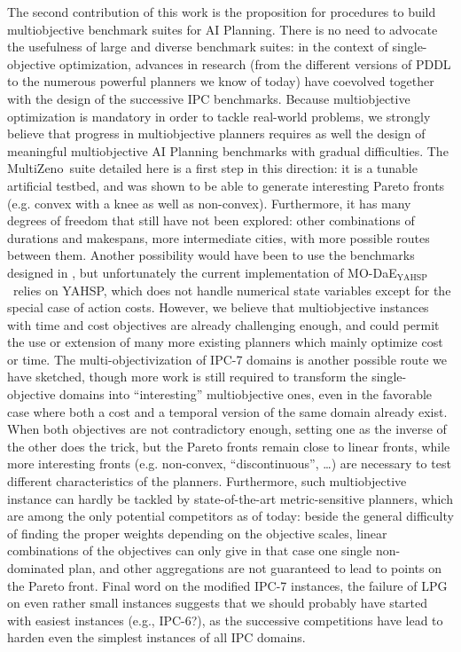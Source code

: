 \documentclass{article}
\newcommand{\MODAEYAHSP}{{\sc MO-DaE$_{\text{YAHSP}}$}}
\def\MULTIZENO{{\sc MultiZeno}}
\begin{document}
The second contribution of this work is the proposition for procedures to build multiobjective benchmark suites for AI Planning. There is no need to advocate the usefulness of large and diverse benchmark suites: in the context of single-objective optimization, advances in research (from the different versions of PDDL to the numerous powerful planners we know of today) have coevolved together with the design of the successive IPC benchmarks. Because multiobjective optimization is mandatory in order to tackle real-world problems, we strongly believe that progress in multiobjective planners requires as well the design of meaningful multiobjective AI Planning benchmarks with gradual difficulties. The \MULTIZENO\ suite detailed here is a first step in this direction: it is a tunable artificial testbed, and was shown to be able to generate interesting Pareto fronts (e.g. convex with a knee as well as non-convex). Furthermore, it has many degrees of freedom that still have not been explored: other combinations of 
durations and makespans, more intermediate cities, with more possible routes between them. 
Another possibility would have been to use the benchmarks designed in \cite{LPG-PlanSIG2012,LPG-STAIRS2012}, but unfortunately the current implementation of \MODAEYAHSP\ relies on YAHSP, which does not handle numerical state variables except for the special case of action costs. However, we believe that multiobjective instances with time and cost objectives are already challenging enough, and could permit the use or extension of many more existing planners which mainly optimize cost or time.
The multi-objectivization of IPC-7 domains is another possible route we have sketched, though more work is still required to transform the single-objective domains into ``interesting'' multiobjective ones, even in the favorable case where both a cost and a temporal version of the same domain already exist. When both objectives are not contradictory enough, setting one as the inverse of the other does the trick, but the Pareto fronts remain close to linear fronts, while more interesting fronts (e.g. non-convex, ``discontinuous'', \ldots) are necessary to test different characteristics of the planners. 
Furthermore, such multiobjective instance can hardly be tackled by state-of-the-art metric-sensitive planners, which are among the only potential competitors as of today: beside the general difficulty of finding the proper weights depending on the objective scales, linear combinations of the objectives can only give in that case one single non-dominated plan, and other aggregations are not guaranteed to lead to points on the Pareto front.
Final word on the modified IPC-7 instances, the failure of LPG on even rather small instances suggests that we should probably have started with easiest instances (e.g., IPC-6?), as the successive competitions have lead to harden even the simplest instances of all IPC domains.
\end{document}
